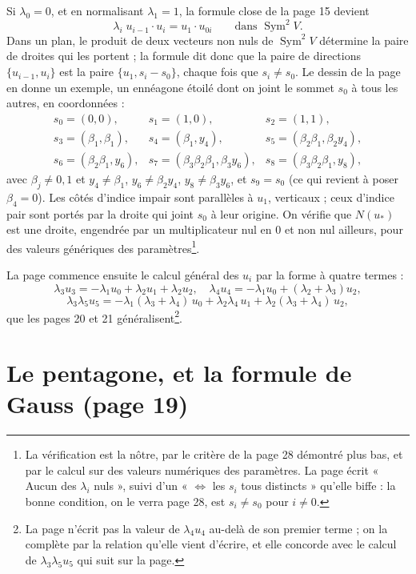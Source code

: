 \documentclass[11pt,a4paper]{article}
\begin{document}
Si $\lambda_0 = 0$, et en normalisant $\lambda_1 = 1$, la formule close de la
page 15 devient
\[
  \lambda_i \; u_{i-1} \cdot u_i = u_1 \cdot u_{0i} \qquad
  \text{dans } \operatorname{Sym}^2 V .
\]
Dans un plan, le produit de deux vecteurs non nuls de
$\operatorname{Sym}^2 V$ détermine la paire de droites qui les portent ; la
formule dit donc que la paire de directions $\{u_{i-1}, u_i\}$ est la paire
$\{u_1, s_i - s_0\}$, chaque fois que $s_i \neq s_0$. Le dessin de la page en
donne un exemple, un ennéagone étoilé dont on joint le sommet $s_0$ à tous les
autres, en coordonnées :
\[
  \begin{array}{lll}
  s_0 = (0,0), & s_1 = (1,0), & s_2 = (1,1), \\
  s_3 = (\beta_1, \beta_1), & s_4 = (\beta_1, y_4), &
  s_5 = (\beta_2 \beta_1, \beta_2 y_4), \\
  s_6 = (\beta_2 \beta_1, y_6), & s_7 = (\beta_3 \beta_2 \beta_1, \beta_3 y_6), &
  s_8 = (\beta_3 \beta_2 \beta_1, y_8),
  \end{array}
\]
avec $\beta_j \neq 0, 1$ et $y_4 \neq \beta_1$, $y_6 \neq \beta_2 y_4$,
$y_8 \neq \beta_3 y_6$, et $s_9 = s_0$ (ce qui revient à poser $\beta_4 = 0$).
Les côtés d'indice impair sont parallèles à $u_1$, verticaux ; ceux d'indice
pair sont portés par la droite qui joint $s_0$ à leur origine. On vérifie que
$N(u_*)$ est une droite, engendrée par un multiplicateur nul en $0$ et non nul
ailleurs, pour des valeurs génériques des paramètres\footnote{La vérification est la nôtre, par le critère de la page 28
démontré plus bas, et par le calcul sur des valeurs numériques des
paramètres. La page écrit « Aucun des $\lambda_i$ nuls », suivi d'un
« $\iff$ les $s_i$ tous distincts » qu'elle biffe : la bonne condition, on le
verra page 28, est $s_i \neq s_0$ pour $i \neq 0$.}.

La page commence ensuite le calcul général des $u_i$ par la forme à quatre
termes :
\[
  \lambda_3 u_3 = -\lambda_1 u_0 + \lambda_2 u_1 + \lambda_2 u_2 , \quad
  \lambda_4 u_4 = -\lambda_1 u_0 + (\lambda_2 + \lambda_3) u_2 ,
\]
\[
  \lambda_3 \lambda_5 u_5 = -\lambda_1 (\lambda_3 + \lambda_4)\, u_0
  + \lambda_2 \lambda_4\, u_1 + \lambda_2 (\lambda_3 + \lambda_4)\, u_2 ,
\]
que les pages 20 et 21 généralisent\footnote{La page n'écrit pas la valeur de
$\lambda_4 u_4$ au-delà de son premier terme ; on la complète par la relation
qu'elle vient d'écrire, et elle concorde avec le calcul de $\lambda_3 \lambda_5
u_5$ qui suit sur la page.}.

\section*{Le pentagone, et la formule de Gauss (page 19)}
\end{document}
